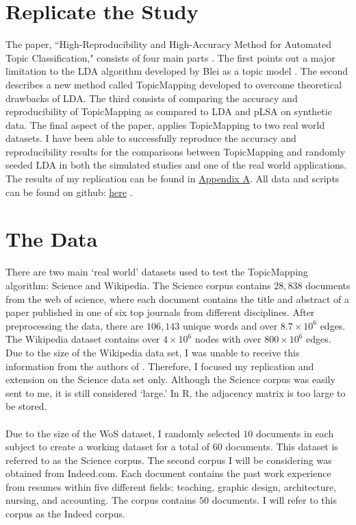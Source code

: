 \documentclass[12pt]{article}
\begin{document}
\section{Replicate the Study}

The paper, ``High-Reproducibility and High-Accuracy Method for Automated Topic Classification," consists of four main parts \cite{main}. The first points out a major limitation to the LDA algorithm developed by Blei as a topic model \cite{lda}. The second describes a new method called TopicMapping developed to overcome theoretical drawbacks of LDA. The third consists of comparing the accuracy and reproducibility of TopicMapping as compared to LDA and pLSA \cite{plsa} on synthetic data. The final aspect of the paper, applies TopicMapping to two real world datasets. I have been able to successfully reproduce the accuracy and reproducibility results for the comparisons between TopicMapping and randomly seeded LDA in both the simulated studies and one of the real world applications. The results of my replication can be found in \hyperlink{A}{Appendix A}. All data and scripts can be found on github:   \href{https://github.com/cmcook22/Cook_Networks_Project}{here} .    

\section{The Data}

There are two main `real world' datasets used to test the TopicMapping algorithm:  Science and Wikipedia. The Science corpus contains $28,838$ documents from the web of science, where each document contains the title and abstract of a paper published in one of six top journals from different disciplines. After preprocessing the data, there are $106,143$ unique words and over $8.7 \times 10^{6}$ edges. The Wikipedia dataset contains over $4 \times 10^{6}$ nodes with over $800 \times 10^{6}$ edges. Due to the size of the Wikipedia data set, I was unable to receive this information from the authors of \cite{main}. Therefore, I focused my replication and extension on the Science data set only. Although the Science corpus was easily sent to me, it is still considered `large.' In R, the adjacency matrix is too large to be stored. 
\\
\\
Due to the size of the WoS dataset, I randomly selected $10$ documents in each subject to create a working dataset for a total of $60$ documents. This dataset is referred to as the Science corpus. The second corpus I will be considering was obtained from Indeed.com. Each document contains the past work experience from resumes within five different fields: teaching, graphic design, architecture, nursing, and accounting. The corpus contains $50$ documents. I will refer to this corpus as the Indeed corpus. 
\end{document}
